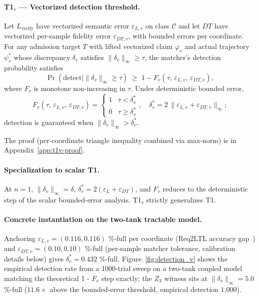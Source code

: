 \paragraph{T1${}_v$ --- Vectorized detection threshold.}
\begin{theorem}
\label{thm:t1v}
Let $L_{\text{verify}}$ have vectorized semantic error
$\varepsilon_{L,v}$ on class $\mathcal{C}$ and let $\mathit{DT}$ have
vectorized per-sample fidelity error $\varepsilon_{DT,v}$, with
bounded errors per coordinate. For any admission target $T$ with
lifted vectorized claim $\varphi_v$ and actual trajectory $\psi_v^{*}$
whose discrepancy $\delta_v$ satisfies $\|\delta_v\|_\infty \geq \tau$,
the matcher's detection probability satisfies
\[
\Pr(\text{detect} \mid \|\delta_v\|_\infty \geq \tau)
   \;\geq\;
1 - F_v(\tau,\,\varepsilon_{L,v},\,\varepsilon_{DT,v}),
\]
where $F_v$ is monotone non-increasing in $\tau$. Under deterministic
bounded error,
\[
F_v(\tau,\,\varepsilon_{L,v},\,\varepsilon_{DT,v}) =
\begin{cases}
1 & \tau < \delta^{*}_{v} \\
0 & \tau \geq \delta^{*}_{v}
\end{cases},
\quad
\delta^{*}_{v} = 2\,\|\varepsilon_{L,v} + \varepsilon_{DT,v}\|_\infty;
\]
detection is guaranteed when $\|\delta_v\|_\infty > \delta^{*}_v$.
\end{theorem}

The proof (per-coordinate triangle inequality combined via max-norm)
is in Appendix~\ref{app:t1v-proof}.

\paragraph{Specialization to scalar T1.}
At $n=1$, $\|\delta_v\|_\infty = \delta$, $\delta^{*}_v =
2(\varepsilon_L + \varepsilon_{DT})$, and $F_v$ reduces to the
deterministic step of the scalar bounded-error analysis. T1${}_v$
strictly generalizes T1.

\paragraph{Concrete instantiation on the two-tank tractable model.}
Anchoring $\varepsilon_{L,v} = (0.116, 0.116)$ \%-full per coordinate
(Req2LTL accuracy gap~\cite{req2ltl}) and $\varepsilon_{DT,v} =
(0.10, 0.10)$ \%-full (per-sample matcher tolerance, calibration
details below) gives $\delta^{*}_v = 0.432$ \%-full.
Figure~\ref{fig:detection_v} shows the empirical detection rate from
a 1000-trial sweep on a two-tank coupled model matching the
theoretical 1 - $F_v$ step exactly; the $Z_3$ witness sits at
$\|\delta_v\|_\infty = 5.0$ \%-full ($11.6\times$ above the
bounded-error threshold, empirical detection $1.000$).

